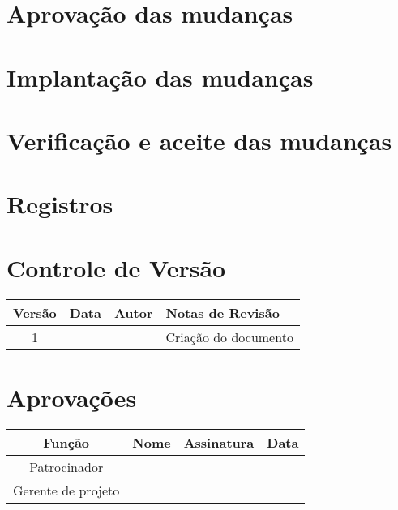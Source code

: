 \section{Aprovação das mudanças}

\section{Implantação das mudanças}

\section{Verificação e aceite das mudanças}

\section{Registros}

\section{Controle de Versão}

\begin{table}[H]
	\begin{tabularx}{\textwidth}{| c | c | X | X |}
		\hline
		\textbf{Versão} & \textbf{Data} & \textbf{Autor}      & \textbf{Notas de Revisão} \\
		\hline
		1                &               & \projectManagerName & Criação do documento     \\
		\hline
	\end{tabularx}
	\centering
\end{table}

\section{Aprovações}

\begin{table}[H]
	\begin{tabularx}{\textwidth}{| c | c | X | c |}
		\hline
		\textbf{Função}  & \textbf{Nome}       & \textbf{Assinatura}      & \textbf{Data} \\
		\hline
		Patrocinador       & \projectSponsorName & \projectSponsorSignature &               \\
		\hline
		Gerente de projeto & \projectManagerName & \projectManagerSignature &               \\
		\hline
	\end{tabularx}
	\centering
\end{table}